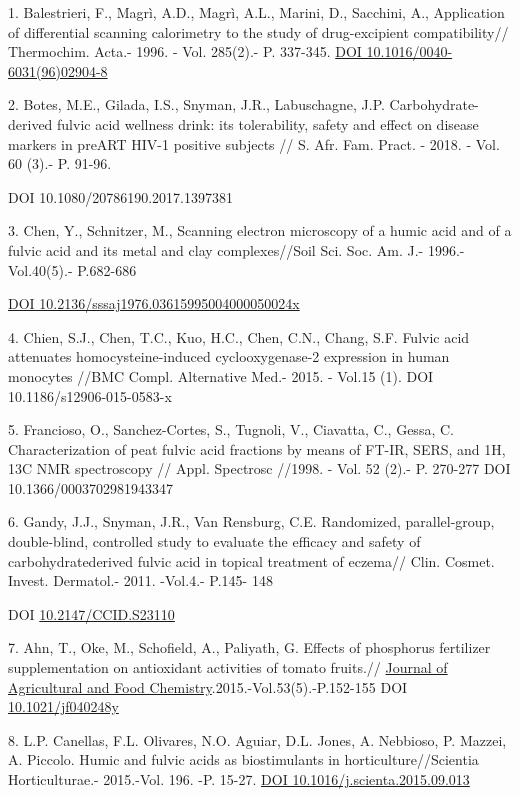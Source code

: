 \begin{references}
1. Balestrieri, F., Magrì, A.D., Magrì, A.L., Marini, D., Sacchini, A.,
Application of differential scanning calorimetry to the study of
drug-excipient compatibility// Thermochim. Acta.- 1996. - Vol. 285(2).-
P. 337-345. \href{https://doi.org/10.1016/0040-6031(96)02904-8}{DOI
10.1016/0040-6031(96)02904-8}

2. Botes, M.E., Gilada, I.S., Snyman, J.R., Labuschagne, J.P.
Carbohydrate-derived fulvic acid wellness drink: its tolerability,
safety and effect on disease markers in preART HIV-1 positive subjects
// S. Afr. Fam. Pract. - 2018. - Vol. 60 (3).- P. 91-96.

DOI 10.1080/20786190.2017.1397381

3. Chen, Y., Schnitzer, M., Scanning electron microscopy of a humic acid
and of a fulvic acid and its metal and clay complexes//Soil Sci. Soc.
Am. J.- 1996.-Vol.40(5).- P.682-686

\href{https://doi.org/10.2136/sssaj1976.03615995004000050024x}{DOI
10.2136/sssaj1976.03615995004000050024x}

4. Chien, S.J., Chen, T.C., Kuo, H.C., Chen, C.N., Chang, S.F. Fulvic
acid attenuates homocysteine-induced cyclooxygenase-2 expression in
human monocytes //BMC Compl. Alternative Med.- 2015. - Vol.15 (1). DOI
10.1186/s12906-015-0583-x

5. Francioso, O., Sanchez-Cortes, S., Tugnoli, V., Ciavatta, C., Gessa,
C. Characterization of peat fulvic acid fractions by means of FT-IR,
SERS, and 1H, 13C NMR spectroscopy // Appl. Spectrosc //1998. - Vol. 52
(2).- P. 270-277 DOI 10.1366/0003702981943347

6. Gandy, J.J., Snyman, J.R., Van Rensburg, C.E. Randomized,
parallel-group, double-blind, controlled study to evaluate the efficacy
and safety of carbohydratederived fulvic acid in topical treatment of
eczema// Clin. Cosmet. Invest. Dermatol.- 2011. -Vol.4.- P.145- 148

DOI \href{https://doi.org/10.2147/ccid.s23110}{10.2147/CCID.S23110}

7. Ahn, T., Oke, M., Schofield, A., Paliyath, G. Effects of phosphorus
fertilizer supplementation on antioxidant activities of tomato fruits.//
\href{https://pubs.acs.org/journal/jafcau?ref=breadcrumb}{Journal of
Agricultural and Food Chemistry}.2015.-Vol.53(5).-P.152-155 DOI
\href{https://doi.org/10.1021/jf040248y}{10.1021/jf040248y}

8. L.P. Canellas, F.L. Olivares, N.O. Aguiar, D.L. Jones, A. Nebbioso,
P. Mazzei, A. Piccolo. Humic and fulvic acids as biostimulants in
horticulture//Scientia Horticulturae.- 2015.-Vol. 196. -P. 15-27.
\href{https://doi.org/10.1016/j.scienta.2015.09.013}{DOI
10.1016/j.scienta.2015.09.013}


\end{references}
